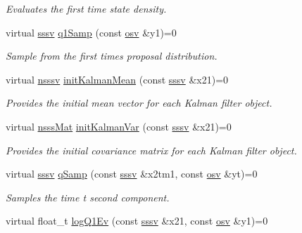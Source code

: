 \begin{DoxyCompactItemize}
\begin{DoxyCompactList}\small\item\em Evaluates the first time state density. \end{DoxyCompactList}\item 
virtual \hyperlink{classrbpf__kalman_a616e56c08c1a6b476e065b2200433915}{sssv} \hyperlink{classrbpf__kalman_aef30f1f668a823347f7860ac38341233}{q1\+Samp} (const \hyperlink{classrbpf__kalman_ae6e59c034c1b0abc7871887ae088055e}{osv} \&y1)=0
\begin{DoxyCompactList}\small\item\em Sample from the first time\textquotesingle{}s proposal distribution. \end{DoxyCompactList}\item 
virtual \hyperlink{classrbpf__kalman_aea6e6dd087b2fca63be4e480dcf0d1c3}{nsssv} \hyperlink{classrbpf__kalman_a799862d3fb775aed84ce58e00dbce458}{init\+Kalman\+Mean} (const \hyperlink{classrbpf__kalman_a616e56c08c1a6b476e065b2200433915}{sssv} \&x21)=0
\begin{DoxyCompactList}\small\item\em Provides the initial mean vector for each Kalman filter object. \end{DoxyCompactList}\item 
virtual \hyperlink{classrbpf__kalman_afb337a9e8f4048c0eae2971ea61f96d5}{nsss\+Mat} \hyperlink{classrbpf__kalman_ac74007e577ea168e89da9e04cefc8c65}{init\+Kalman\+Var} (const \hyperlink{classrbpf__kalman_a616e56c08c1a6b476e065b2200433915}{sssv} \&x21)=0
\begin{DoxyCompactList}\small\item\em Provides the initial covariance matrix for each Kalman filter object. \end{DoxyCompactList}\item 
virtual \hyperlink{classrbpf__kalman_a616e56c08c1a6b476e065b2200433915}{sssv} \hyperlink{classrbpf__kalman_a03a9dce900a6a917f58f43cbcb906867}{q\+Samp} (const \hyperlink{classrbpf__kalman_a616e56c08c1a6b476e065b2200433915}{sssv} \&x2tm1, const \hyperlink{classrbpf__kalman_ae6e59c034c1b0abc7871887ae088055e}{osv} \&yt)=0
\begin{DoxyCompactList}\small\item\em Samples the time t second component. \end{DoxyCompactList}\item 
virtual float\+\_\+t \hyperlink{classrbpf__kalman_aa9f14f59792b7de573439e318e0a451b}{log\+Q1\+Ev} (const \hyperlink{classrbpf__kalman_a616e56c08c1a6b476e065b2200433915}{sssv} \&x21, const \hyperlink{classrbpf__kalman_ae6e59c034c1b0abc7871887ae088055e}{osv} \&y1)=0

\end{DoxyCompactItemize}

